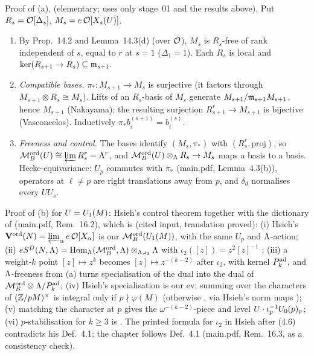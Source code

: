 \begin{outline}
Proof of (a), \stproved{} (elementary; uses only stage~01 and the results above). Put $R_s=\mathcal{O}[\Delta_s]$, $M_s=e\,\mathcal{O}[X_s(U)]$.
\begin{enumerate}[label=\arabic*.]
\item By Prop.~14.2 and Lemma~14.3(d) (over $\mathcal{O}$), $M_s$ is $R_s$-free of rank independent of $s$, equal to $r$ at $s=1$
  ($\Delta_1=1$). Each $R_s$ is local and $\ker(R_{s+1}\to R_s)\subseteq\mathfrak{m}_{s+1}$.
\item \emph{Compatible bases.} $\pi_*:M_{s+1}\to M_s$ is surjective (it factors through $M_{s+1}\otimes R_s\cong M_s$). Lifts of an
  $R_s$-basis of $M_s$ generate $M_{s+1}/\mathfrak{m}_{s+1}M_{s+1}$, hence $M_{s+1}$ (Nakayama); the resulting surjection $R_{s+1}^r\to M_{s+1}$
  is bijective (Vasconcelos). Inductively $\pi_*b^{(s+1)}_i=b^{(s)}_i$.
\item \emph{Freeness and control.} The bases identify $(M_s,\pi_*)$ with $(R_s^r,\text{proj})$, so
  $\mathcal{M}^{\mathrm{ord}}_B(U)\cong\varprojlim R_s^r=\Lambda^r$, and $\mathcal{M}^{\mathrm{ord}}_B(U)\otimes_\Lambda R_s\to M_s$ maps a basis to a basis. Hecke-equivariance: $U_p$
  commutes with $\pi_*$ (main.pdf, Lemma~4.3(b)), operators at $\ell\ne p$ are right translations away from $p$, and $\delta_d$
  normalises every $UU_s$.
\end{enumerate}
Proof of (b) for $U=U_1(M)$: Hsieh's control theorem \cite[Thm.~4.2(2), p.~32]{Hs} together with the dictionary of
(main.pdf, Rem.~16.2), which is \stpmc{} (cited input, translation proved):
(i) Hsieh's $\mathbf V^{\rm ord}(N)=\varprojlim_\alpha e\,\mathcal{O}[X_\alpha]$ is our $\mathcal{M}^{\mathrm{ord}}_B(U_1(M))$, with the same $U_p$ and $\Lambda$-action;
(ii) $eS^D(N,\Lambda)=\operatorname{Hom}_\Lambda(\mathcal{M}^{\mathrm{ord}}_B,\Lambda)\otimes_{\Lambda,\iota_2}\Lambda$ with $\iota_2([z])=z^2[z]^{-1}$ \cite[(4.6), Def.~4.1, p.~31]{Hs};
(iii) a weight-$k$ point $[z]\mapsto z^k$ becomes $[z]\mapsto z^{-(k-2)}$ after $\iota_2$, with kernel $P^{\rm ad}_k$, and $\Lambda$-freeness
from (a) turns specialisation of the dual into the dual of $\mathcal{M}^{\mathrm{ord}}_B\otimes\Lambda/P^{\rm ad}_k$; (iv) Hsieh's specialisation is our
$\mathrm{ev}$; summing over the characters of $(\mathbb{Z}/pM)^\times$ is integral only if $p\nmid\varphi(M)$ (otherwise \stsketch, via Hsieh's
norm maps \cite[Thm.~4.2(1)]{Hs}); (v) matching the character at $p$ gives the $\omega^{-(k-2)}$-piece and level
$U\cdot\iota_p^{-1}U_0(p)_p$; (vi) $p$-stabilisation for $k\ge3$ is \stexp. The printed formula for $\iota_2$ in Hsieh after (4.6)
contradicts his Def.~4.1; the chapter follows Def.~4.1 (main.pdf, Rem.~16.3, \stproved{} as a consistency check).
\end{outline}

